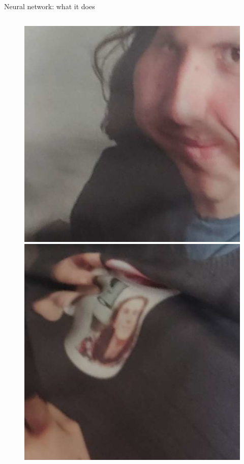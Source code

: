 \documentclass{beamer}
\begin{document}
\begin{frame}{Neural network: what it does}
\begin{columns}
\begin{column}{0.05\textwidth}
\begin{figure}
                \includegraphics[width=\linewidth]{distorted/distorted-1-1}
                \includegraphics[width=\linewidth]{distorted/distorted-1-2}

\end{figure}
\end{column}
\end{columns}
\end{frame}
\end{document}
